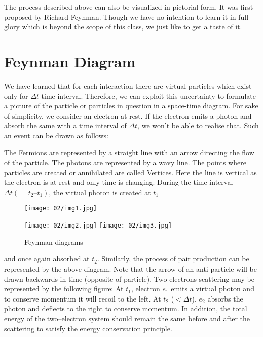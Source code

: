     \par The process described above can also be visualized in pictorial form. It was first proposed by Richard Feynman. Though we have no intention to learn it in full glory which is beyond the scope of this class, we just like to get a taste of it. 
    
    \section{Feynman Diagram}
        \par We have learned that for each interaction there are virtual particles which exist only for $\Delta t $ time interval. Therefore, we can exploit this uncertainty to formulate a picture of the particle or particles in question in a space-time diagram. For sake of simplicity, we consider an electron at rest. If the electron emits a photon and absorb the same with a time interval of $\Delta t $, we won't be able to realise that. Such an event can be drawn as follows: 
        \par The Fermions are represented by a straight line with an arrow directing the flow of the particle. The photons are represented by a wavy line. The points where particles are created or annihilated are called Vertices. Here the line is vertical as the electron is at rest and only time is changing. During the time interval $\Delta t(= t_2–t_1)$, the virtual photon is created at $t_1$
        \begin{figure}
            \begin{center}
                \texttt{[image: 02/img1.jpg]}
            \end{center}
            \texttt{[image: 02/img2.jpg]}
            \texttt{[image: 02/img3.jpg]}
            \caption{Feynman diagrams}
            \label{fig:plot_time_space}
        \end{figure}
        and once again absorbed at $t_2$. Similarly, the process of pair production can be represented by the above diagram. Note that the arrow of an anti-particle will be drawn backwards in time (opposite of particle). Two electrons scattering may be represented by the following figure:  At $t_1$, electron $e_1$ emits a virtual photon and to conserve momentum it will recoil to the left. At $t_2$ ($<\Delta t$), $e_2$ absorbs the photon and deflects to the right to conserve momentum. In addition, the total energy of the two–electron system should remain the same before and after the scattering to satisfy the energy conservation principle.
